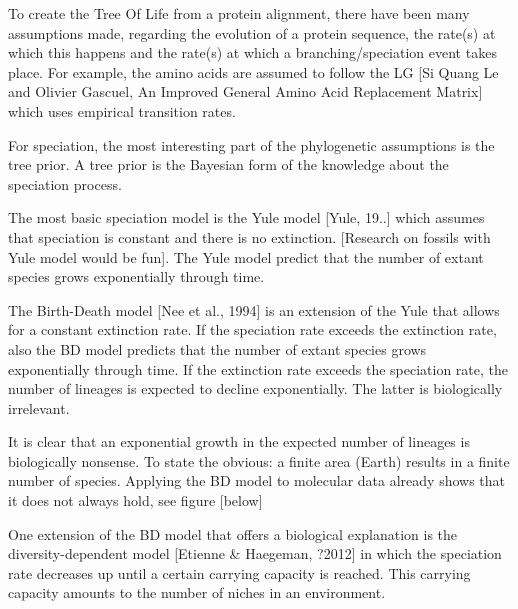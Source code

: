 To create the Tree Of Life from a protein alignment, 
there have been many assumptions 
made, regarding the evolution of a protein sequence, 
the rate(s) at which this happens and the rate(s) at which 
a branching/speciation event takes place. For example,
the amino acids are assumed to follow the LG [Si Quang 
Le and Olivier Gascuel, An Improved General Amino Acid Replacement Matrix] 
which uses empirical transition rates.

%
%

For speciation, the most interesting part of the phylogenetic
assumptions is the tree prior. A tree prior is the Bayesian
form of the knowledge about the speciation process.

The most basic speciation model
is the Yule model [Yule, 19..] which assumes that speciation
is constant and there is no extinction.
[Research on fossils with Yule model would be fun].
The Yule model predict that the number of extant species
grows exponentially through time.

%

The Birth-Death model [Nee et al., 1994] is an extension of the
Yule that allows for a constant extinction rate. 
If the speciation rate exceeds the extinction rate,
also the BD model predicts that the number of extant species
grows exponentially through time. If the extinction rate exceeds
the speciation rate, the number of lineages is expected to decline
exponentially. The latter is biologically irrelevant.

%

It is clear that an exponential growth in the expected number of lineages
is biologically nonsense. 
To state the obvious: a finite area (Earth) results in a finite number of species. 
Applying the BD model to molecular data already shows that it does not
always hold, see figure [below]

%
%
%
%
%

One extension of the BD model that offers a biological explanation is the
diversity-dependent model [Etienne & Haegeman, ?2012] in which the
speciation rate decreases up until a certain carrying capacity is reached.
This carrying capacity amounts to the number of niches in an environment.

